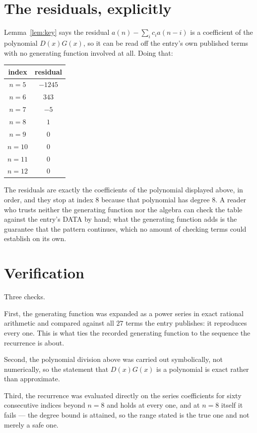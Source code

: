 \documentclass[11pt,a4paper]{article}
\theoremstyle{plain}
\theoremstyle{definition}
\begin{document}
\section{The residuals, explicitly}

Lemma~\ref{lem:key} says the residual $a(n)-\sum_ic_ia(n-i)$ is a coefficient of the
polynomial $D(x)G(x)$, so it can be read off the entry's own published terms with no
generating function involved at all. Doing that:
\begin{center}
\begin{tabular}{cc}
index & residual \\ \hline
$n=5$ & $-1245$ \\
$n=6$ & $343$ \\
$n=7$ & $-5$ \\
$n=8$ & $1$ \\
$n=9$ & $0$ \\
$n=10$ & $0$ \\
$n=11$ & $0$ \\
$n=12$ & $0$
\end{tabular}
\end{center}
The residuals are exactly the coefficients of the polynomial displayed above, in order, and
they stop at index $8$ because that polynomial has degree $8$. A reader who trusts
neither the generating function nor the algebra can check the table against the entry's DATA
by hand; what the generating function adds is the guarantee that the pattern continues, which
no amount of checking terms could establish on its own.

\section{Verification}

Three checks.

First, the generating function was expanded as a power series in exact rational arithmetic and
compared against all $27$ terms the entry publishes: it reproduces every one. This is
what ties the recorded generating function to the sequence the recurrence is about.

Second, the polynomial division above was carried out symbolically, not numerically, so the
statement that $D(x)G(x)$ is a polynomial is exact rather than approximate.

Third, the recurrence was evaluated directly on the series coefficients for sixty consecutive
indices beyond $n=8$ and holds at every one, and at $n=8$ itself it fails --- the
degree bound is attained, so the range stated is the true one and not merely a safe one.
\end{document}

